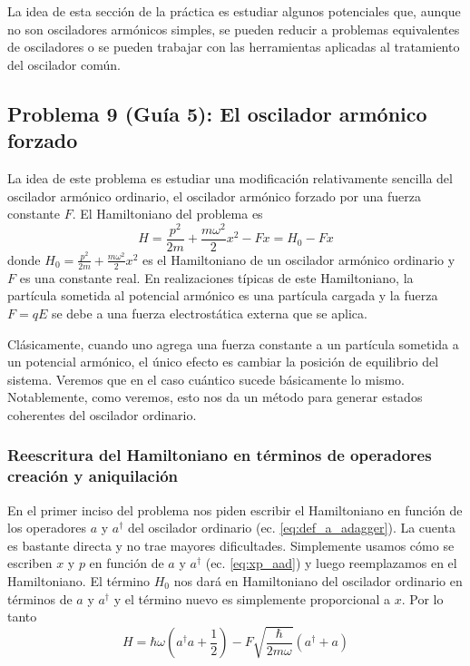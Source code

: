 \documentclass[10pt, a4paper]{article}
\newcommand{\xprefactsq}{\frac{\hbar}{2m\omega}}
\newcommand{\xprefact}{\sqrt{\xprefactsq}}
\numberwithin{equation}{subsection}
\begin{document}
La idea de esta sección de la práctica es estudiar algunos potenciales que,
aunque no son osciladores armónicos simples, se pueden reducir a problemas
equivalentes de osciladores o se pueden trabajar con las herramientas aplicadas
al tratamiento del oscilador común.

\subsection{Problema 9 (Guía 5): El oscilador armónico forzado}
\label{exc:forcedho}

La idea de este problema es estudiar una modificación relativamente sencilla
del oscilador armónico ordinario, el oscilador armónico forzado por una fuerza
constante $F$. El Hamiltoniano del problema es
\begin{equation}
  H = \frac{p^2}{2m} + \frac{m\omega^2}{2}x^2 - Fx
    = H_0 - Fx
\end{equation}
donde $H_0 = \frac{p^2}{2m} + \frac{m\omega^2}{2}x^2$ es el Hamiltoniano de un
oscilador armónico ordinario y $F$ es una constante real. En realizaciones
típicas de este Hamiltoniano, la partícula sometida al potencial armónico es
una partícula cargada y la fuerza $F = qE$ se debe a una fuerza electrostática
externa que se aplica.

Clásicamente, cuando uno agrega una fuerza constante a un partícula sometida a
un potencial armónico, el único efecto es cambiar la posición de equilibrio del
sistema. Veremos que en el caso cuántico sucede básicamente lo mismo.
Notablemente, como veremos, esto nos da un método para generar estados
coherentes del oscilador ordinario.

\subsubsection{Reescritura del Hamiltoniano en términos de operadores creación
  y aniquilación}
En el primer inciso del problema nos piden escribir el Hamiltoniano en función
de los operadores $a$ y $a^\dagger$ del oscilador ordinario (ec.
\eqref{eq:def_a_adagger}). La cuenta es bastante directa y no trae mayores
dificultades. Simplemente usamos cómo se escriben $x$ y $p$ en función de $a$ y
$a^\dagger$ (ec. \eqref{eq:xp_aad}) y luego reemplazamos en el Hamiltoniano. El
término $H_0$ nos dará en Hamiltoniano del oscilador ordinario en términos de
$a$ y $a^\dagger$ y el término nuevo es simplemente proporcional a $x$. Por lo
tanto
\begin{equation}
  H = \hbar\omega\left(a^\dagger a + \frac{1}{2}\right) -
    F\xprefact\left(a^\dagger + a\right)
\end{equation}
\end{document}
